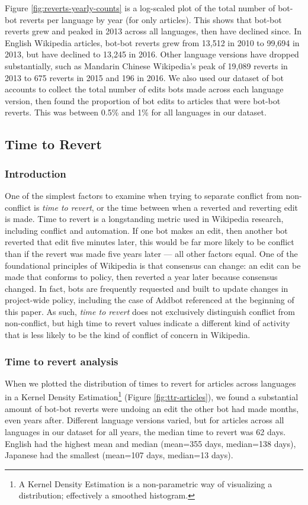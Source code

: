 \documentclass[format=acmsmall, review=false, screen=true]{acmart}%
\begin{document}
Figure \ref{fig:reverts-yearly-counts} is a log-scaled plot of the total number of bot-bot reverts per language by year (for only articles). This shows that bot-bot reverts grew and peaked in 2013 across all languages, then have declined since. In English Wikipedia articles, bot-bot reverts grew from 13,512 in 2010 to 99,694 in 2013, but have declined to 13,245 in 2016. Other language versions have dropped substantially, such as Mandarin Chinese Wikipedia's peak of 19,089 reverts in 2013 to 675 reverts in 2015 and 196 in 2016. We also used our dataset of bot accounts to collect the total number of edits bots made across each language version, then found the proportion of bot edits to articles that were bot-bot reverts. This was between 0.5\% and 1\% for all languages in our dataset.  

\subsection{Time to Revert}  \label{s:exploratory:ttr}
\subsubsection{Introduction}
One of the simplest factors to examine when trying to separate conflict from non-conflict is \emph{time to revert}, or the time between when a reverted and reverting edit is made. Time to revert is a longstanding metric used in Wikipedia research, including conflict \cite{Viegas2007} and automation. \cite{Geiger2013, Halfaker2013} If one bot makes an edit, then another bot reverted that edit five minutes later, this would be far more likely to be conflict than if the revert was made five years later --- all other factors equal. One of the foundational principles of Wikipedia is that consensus can change: an edit can be made that conforms to policy, then reverted a year later because consensus changed. In fact, bots are frequently requested and built to update changes in project-wide policy, including the case of Addbot referenced at the beginning of this paper. As such, \emph{time to revert} does not exclusively distinguish conflict from non-conflict, but high time to revert values indicate a different kind of activity that is less likely to be the kind of conflict of concern in Wikipedia.    

\subsubsection{Time to revert analysis}  
When we plotted the distribution of times to revert for articles across languages in a Kernel Density Estimation\footnote{A Kernel Density Estimation is a non-parametric way of visualizing a distribution; effectively a smoothed histogram.} (Figure \ref{fig:ttr-articles}), we found a substantial amount of bot-bot reverts were undoing an edit the other bot had made months, even years after. Different language versions varied, but for articles across all languages in our dataset for all years, the median time to revert was 62 days. English had the highest mean and median (mean=355 days, median=138 days), Japanese had the smallest (mean=107 days, median=13 days).  
\end{document}
